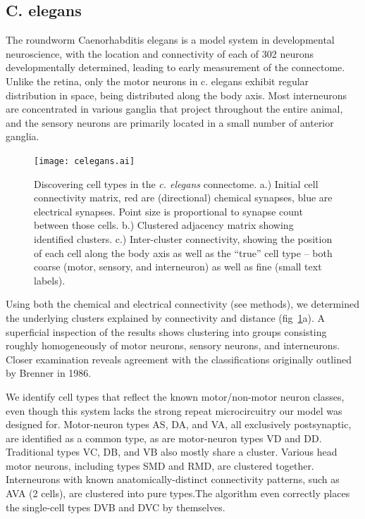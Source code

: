 \documentclass{article}
\begin{document}
\subsection{C. elegans}

The roundworm Caenorhabditis elegans is a model system in
developmental neuroscience\autocite{White1986}, with the location and
connectivity of each of 302 neurons developmentally determined,
leading to early measurement of the connectome. Unlike the retina,
only the motor neurons in c. elegans exhibit regular distribution in
space, being distributed along the body axis. Most interneurons are
concentrated in various ganglia that project throughout the entire
animal, and the sensory neurons are primarily located in a small
number of anterior ganglia.

\begin{figure}
  \centering 
  \centerline{\texttt{[image: celegans.ai]}}
  \caption{Discovering cell types in the \textit{c. elegans}
    connectome. a.) Initial cell connectivity matrix, red are
    (directional) chemical synapses, blue are electrical
    synapses. Point size is proportional to synapse count between
    those cells. b.) Clustered adjacency matrix showing identified
    clusters. c.) Inter-cluster connectivity, showing the position of
    each cell along the body axis as well as the ``true'' cell type --
    both coarse (motor, sensory, and interneuron) as well as fine
    (small text labels). }
  \label{fig:celegans}
\end{figure}

Using both the chemical and electrical connectivity (see methods), we
determined the underlying clusters explained by connectivity and
distance (fig~\ref{fig:celegans}a). A superficial inspection of the results shows
clustering into groups consisting roughly homogeneously of motor
neurons, sensory neurons, and interneurons. Closer examination reveals
agreement with the classifications originally outlined by Brenner in
1986.  

We identify cell types that reflect the known motor/non-motor neuron
classes, even though this system lacks the strong repeat
microcircuitry our model was designed for.  Motor-neuron types AS, DA,
and VA, all exclusively postsynaptic, are identified as a common type,
as are motor-neuron types VD and DD. Traditional types VC, DB, and VB
also mostly share a cluster. Various head motor neurons, including
types SMD and RMD, are clustered together. Interneurons with known
anatomically-distinct connectivity patterns, such as AVA (2 cells),
are clustered into pure types.The algorithm even correctly places the
single-cell types DVB and DVC by themselves.
\end{document}
